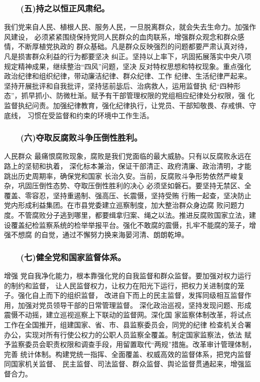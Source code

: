 \documentclass[11pt]{ctexart}
\begin{document}
{{{{\subsubsection{　　(五)持之以恒正风肃纪。}
\label{sec:orgaa9fbdc}

我们党来自人民、植根人民、服务人民，一旦脱离群众，就会失去生命力。加强作风建设，
必须紧紧围绕保持党同人民群众的血肉联系，增强群众观念和群众感情，不断厚植党执政的
群众基础。凡是群众反映强烈的问题都要严肃认真对待，凡是损害群众利益的行为都要坚决
纠正。坚持以上率下，巩固拓展落实中央八项规定精神成果，继续整治“四风”问题，坚决
反对特权思想和特权现象。重点强化政治纪律和组织纪律，带动廉洁纪律、群众纪律、工作
纪律、生活纪律严起来。坚持开展批评和自我批评，坚持惩前毖后、治病救人，运用监督执
纪“四种形态”，抓早抓小、防微杜渐。赋予有干部管理权限的党组相应纪律处分权限，强
化监督执纪问责。加强纪律教育，强化纪律执行，让党员、干部知敬畏、存戒惧、守底线，
习惯在受监督和约束的环境中工作生活。

\subsubsection{　　(六)夺取反腐败斗争压倒性胜利。}
\label{sec:org6c78f89}

人民群众
最痛恨腐败现象，腐败是我们党面临的最大威胁。只有以反腐败永远在路上的坚韧和执着，
深化标本兼治，保证干部清正、政府清廉、政治清明，才能跳出历史周期率，确保党和国家
长治久安。当前，反腐败斗争形势依然严峻复杂，巩固压倒性态势、夺取压倒性胜利的决心
必须坚如磐石。要坚持无禁区、全覆盖、零容忍，坚持重遏制、强高压、长震慑，坚持受贿
行贿一起查，坚决防止党内形成利益集团。在市县党委建立巡察制度，加大整治群众身边腐
败问题力度。不管腐败分子逃到哪里，都要缉拿归案、绳之以法。推进反腐败国家立法，建
设覆盖纪检监察系统的检举举报平台。强化不敢腐的震慑，扎牢不能腐的笼子，增强不想腐
的自觉，通过不懈努力换来海晏河清、朗朗乾坤。

\subsubsection{　　(七)健全党和国家监督体系。}
\label{sec:orgd6e60ff}

增强
党自我净化能力，根本靠强化党的自我监督和群众监督。要加强对权力运行的制约和监督，
让人民监督权力，让权力在阳光下运行，把权力关进制度的笼子。强化自上而下的组织监督，
改进自下而上的民主监督，发挥同级相互监督作用，加强对党员领导干部的日常管理监督。
深化政治巡视，坚持发现问题、形成震慑不动摇，建立巡视巡察上下联动的监督网。深化国
家监察体制改革，将试点工作在全国推开，组建国家、省、市、县监察委员会，同党的纪律
检查机关合署办公，实现对所有行使公权力的公职人员监察全覆盖。制定国家监察法，依法
赋予监察委员会职责权限和调查手段，用留置取代“两规”措施。改革审计管理体制，完善
统计体制。构建党统一指挥、全面覆盖、权威高效的监督体系，把党内监督同国家机关监督、
民主监督、司法监督、群众监督、舆论监督贯通起来，增强监督合力。

}}}}
\end{document}
